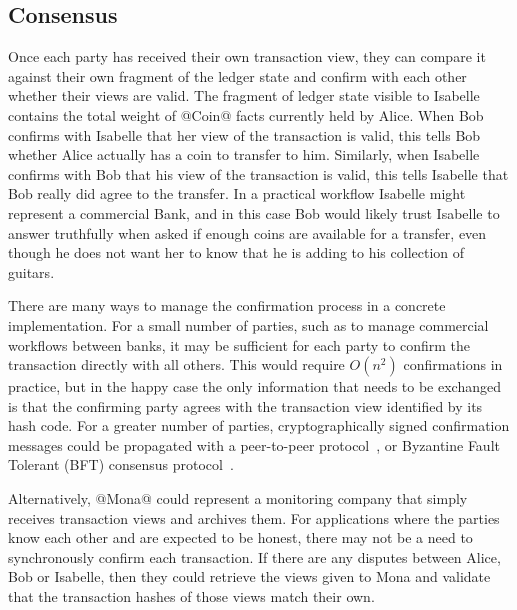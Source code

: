 \subsection{Consensus}
Once each party has received their own transaction view, they can compare it against their own fragment of the ledger state and confirm with each other whether their views are valid. The fragment of ledger state visible to Isabelle contains the total weight of @Coin@ facts currently held by Alice. When Bob confirms with Isabelle that her view of the transaction is valid, this tells Bob whether Alice actually has a coin to transfer to him. Similarly, when Isabelle confirms with Bob that his view of the transaction is valid, this tells Isabelle that Bob really did agree to the transfer. In a practical workflow Isabelle might represent a commercial Bank, and in this case Bob would likely trust Isabelle to answer truthfully when asked if enough coins are available for a transfer, even though he does not want her to know that he is adding to his collection of guitars.

There are many ways to manage the confirmation process in a concrete implementation. For a small number of parties, such as to manage commercial workflows between banks, it may be sufficient for each party to confirm the transaction directly with all others. This would require $O(n^2)$ confirmations in practice, but in the happy case the only information that needs to be exchanged is that the confirming party agrees with the transaction view identified by its hash code. For a greater number of parties, cryptographically signed confirmation messages could be propagated with a peer-to-peer protocol~\cite{El-Ansary2003:Broadcast}, or Byzantine Fault Tolerant (BFT) consensus protocol~\cite{Lamport1982:Byzantine, Ongaro2014:Consensus, Gilad2017:Algorand}.

Alternatively, @Mona@ could represent a monitoring company that simply receives transaction views and archives them. For applications where the parties know each other and are expected to be honest, there may not be a need to synchronously confirm each transaction. If there are any disputes between Alice, Bob or Isabelle, then they could retrieve the views given to Mona and validate that the transaction hashes of those views match their own.



